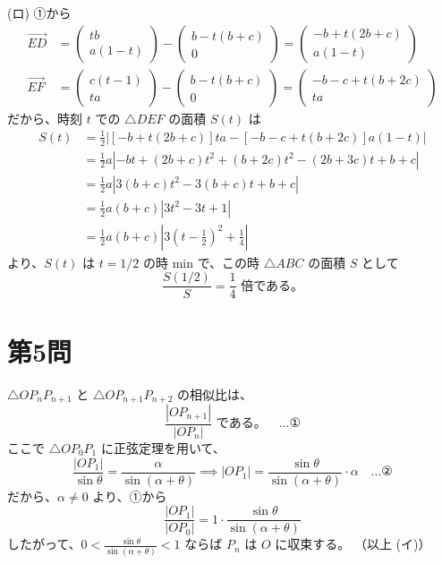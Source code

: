 \documentclass[../main.tex]{subfiles}
\begin{document}
\noindent
(ロ) ①から
\begin{align*}
  \vec{ED} &=
  \begin{pmatrix} tb \\ a(1-t)
  \end{pmatrix} -
  \begin{pmatrix} b-t(b+c) \\ 0
  \end{pmatrix} =
  \begin{pmatrix} -b+t(2b+c) \\ a(1-t)
  \end{pmatrix} \\
  \vec{EF} &=
  \begin{pmatrix} c(t-1) \\ ta
  \end{pmatrix} -
  \begin{pmatrix} b-t(b+c) \\ 0
  \end{pmatrix} =
  \begin{pmatrix} -b-c+t(b+2c) \\ ta
  \end{pmatrix}
\end{align*}
だから、時刻 $t$ での $\triangle DEF$ の面積 $S(t)$ は
\begin{align*}
  S(t) &= \frac{1}{2} \left| [-b+t(2b+c)] ta - [-b-c+t(b+2c)] a(1-t) \right| \\
  &= \frac{1}{2} a \left| -bt + (2b+c)t^2 + (b+2c)t^2 - (2b+3c)t + b+c \right| \\
  &= \frac{1}{2} a \left| 3(b+c)t^2 - 3(b+c)t + b+c \right| \\
  &= \frac{1}{2} a(b+c) \left| 3t^2 - 3t + 1 \right| \\
  &= \frac{1}{2} a(b+c) \left| 3\left(t - \frac{1}{2}\right)^2 + \frac{1}{4} \right|
\end{align*}
より、$S(t)$ は $t = 1/2$ の時 min で、この時 $\triangle ABC$ の面積 $S$ として
\[
  \frac{S(1/2)}{S} = \frac{1}{4} \text{ 倍である。}
\]

\newpage

\section*{第5問}

\noindent
[\textbf{解}] $\triangle O P_n P_{n+1}$ と $\triangle O P_{n+1} P_{n+2}$ の相似比は、
\[
  \frac{|O P_{n+1}|}{|O P_n|} \text{ である。} \quad \dots \text{①}
\]
ここで $\triangle O P_0 P_1$ に正弦定理を用いて、
\[
  \frac{|O P_1|}{\sin \theta} = \frac{\alpha}{\sin(\alpha+\theta)} \implies |O P_1| = \frac{\sin \theta}{\sin(\alpha+\theta)} \cdot \alpha \quad \dots \text{②}
\]
だから、$\alpha \neq 0$ より、①から
\[
  \frac{|O P_1|}{|O P_0|} = 1 \cdot \frac{\sin \theta}{\sin(\alpha+\theta)}
\]
したがって、$0 < \frac{\sin \theta}{\sin(\alpha+\theta)} < 1$ ならば $P_n$ は $O$ に収束する。 （以上 (イ)）
\end{document}
